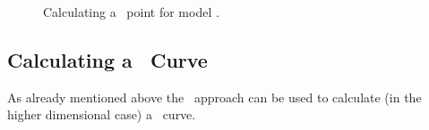 \begin{figure}
\centering
	\goodgap
	\label{fig:plot_dnss_mom}
	\caption{Calculating a \DNSP\ point for model \MOM.}
\end{figure}

\subsection{Calculating a \DNSP\ Curve}
As already mentioned above the \BVP\ approach can be used to calculate (in the higher dimensional case) a \DNSP\ curve.
